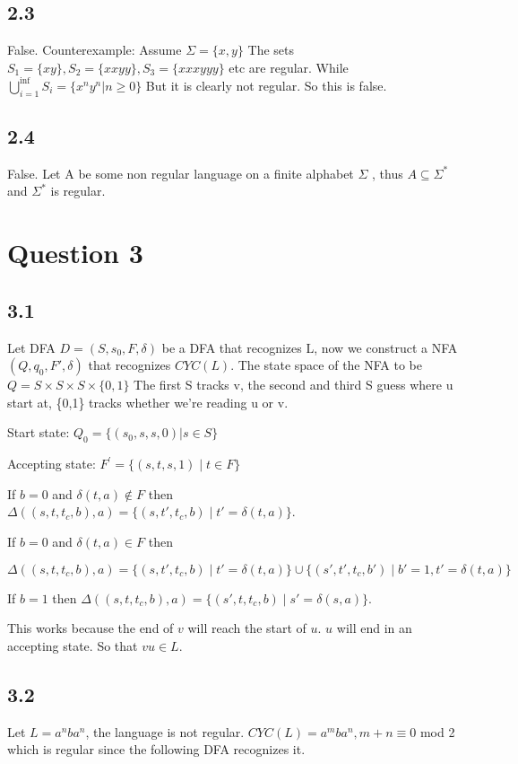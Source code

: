 \documentclass[a4paper, 11pt]{article}
\begin{document}
\subsection*{2.3}
False. Counterexample: Assume $\Sigma=\{x,y\}$ The sets $S_1= \{xy\},S_2=\{xxyy\},S_3=\{xxxyyy\}$ etc are regular. While $\bigcup_{i=1}^{\inf}S_i=\{x^ny^n|n\geq 0\}$ But it is clearly not regular. So this is false.

\subsection*{2.4}
 False. Let A be some non regular language on a finite alphabet $\Sigma$ , thus $A \subseteq \Sigma^*$ and $\Sigma^*$ is regular.
 
\section*{Question 3}
\subsection*{3.1}
Let DFA $D=(S,s_0,F,\delta)$ be a DFA that recognizes L, now we construct a NFA $(Q,q_0,F',\delta)$ that recognizes $CYC(L)$. The state space of the NFA to be $Q=S \times S \times S \times \{0,1\}$ The first S tracks v, the second and third S guess where u start at, \{0,1\} tracks whether we're reading u or v.

Start state: $Q_0=\{(s_0,s,s,0) | s \in S\}$

Accepting state: $F^{'}=\{(s,t,s,1) \mid t\in F \}$

If $b=0$ and $\delta(t,a) \notin F$ then $\Delta((s,t,t_c,b),a) = \{(s,t',t_c,b)\mid t'=\delta(t,a)\}$.

If $b=0$ and $\delta(t,a) \in F$ then

\qquad$\Delta((s,t,t_c,b),a) = \{(s,t',t_c,b)\mid t'=\delta(t,a)\} \cup \{(s',t',t_c,b')\mid b'=1,t'=\delta(t,a)\}$

If $b=1$ then $\Delta((s,t,t_c,b),a) = \{(s',t,t_c,b)\mid s'=\delta(s,a)\}$.

This works because the end of $v$ will reach the start of $u$. $u$ will end in an accepting
state. So that $vu\in L$.

\subsection*{3.2}
Let $L=a^nba^n$, the language is not regular. $CYC(L)=a^mba^n,m+n\equiv0$ mod 2 which is regular since the following DFA recognizes it.
\end{document}
